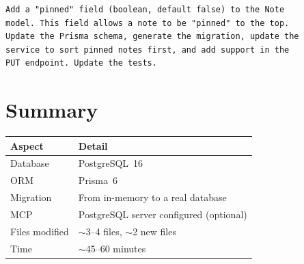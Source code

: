 \begin{praticabox}[title={Hands-On --- Add a field}]
\begin{lstlisting}[language={}]
Add a "pinned" field (boolean, default false) to the Note
model. This field allows a note to be "pinned" to the top.
Update the Prisma schema, generate the migration, update the
service to sort pinned notes first, and add support in the
PUT endpoint. Update the tests.
\end{lstlisting}
\end{praticabox}

\section*{Summary}

\begin{center}
\begin{tabularx}{\textwidth}{l X}
\toprule
\textbf{Aspect} & \textbf{Detail} \\
\midrule
Database & PostgreSQL~16 \\
ORM & Prisma~6 \\
Migration & From in-memory to a real database \\
MCP & PostgreSQL server configured (optional) \\
Files modified & $\sim$3--4 files, $\sim$2 new files \\
Time & $\sim$45--60 minutes \\
\bottomrule
\end{tabularx}
\end{center}

